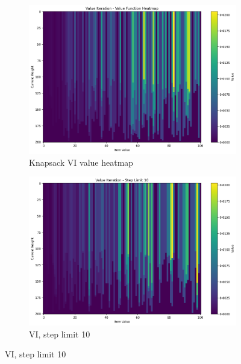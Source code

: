 \documentclass[10pt,a4paper]{article}
\begin{document}
\begin{figure}[H]
\centering
\begin{subcaptiongroup}
\begin{subfigure}{0.48\textwidth}
\includegraphics[width=\linewidth]{../Q2/part1/value_iteration_-_value_function_heatmap.png}
\caption{Knapsack VI value heatmap}
\end{subfigure}\hfill
\begin{subfigure}{0.48\textwidth}
\includegraphics[width=\linewidth]{../Q2/part1/value_iteration_-_step_limit_10.png}
\caption{VI, step limit 10}
\end{subfigure}
\end{subcaptiongroup}


\end{figure}
\end{document}
